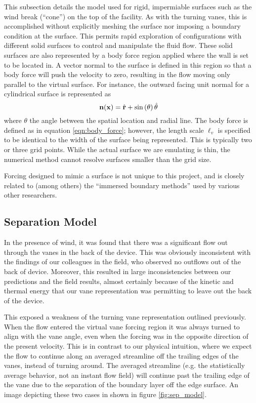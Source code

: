 This subsection details the model used for rigid, impermiable surfaces such as the 
wind break (``cone'') on the top of the facility. As with the turning vanes, 
this is accomplished without explicitly meshing the surface nor imposing 
a boundary condition at the surface. This permits rapid exploration of configurations 
with different solid surfaces to control and manipulate the fluid flow. These solid surfaces
are also represented by a body force region applied where the wall is set to be located in. 
A vector normal to the surface is defined in this region so that a body force will push 
the velocity to zero, resulting in the flow moving only parallel to the virtual surface. 
For instance, the outward facing unit normal for a cylindrical surface is represented as
\begin{equation}
 {\bf n}({\bf x}) = \hat{{\bf r}}+ \sin \left(\theta\right) \hat{{\bf \theta}}
\end{equation}
where $\theta$ the angle between the spatial location and radial line. 
The body force is defined as in equation \ref{eqn:body_force}; however, 
the length scale $\ell_v$ is specified to be identical to the width 
of the surface being represented. This is typically two or three grid points. 
While the actual surface we are emulating is thin, the numerical method cannot resolve
surfaces smaller than the grid size. 

Forcing designed to mimic a surface
is not unique to this project, and is closely related to (among others)
the ``immersed boundary methods'' used by various other
researchers\cite{doi:10.1146/annurev.fluid.37.061903.175743}. 


\subsection{Separation Model}

In the presence of wind, it was found that there was a significant flow
out through the vanes in the back of the device. This was obviously
inconsistent with the findings of our colleagues in the field, who
observed no outflows out of the back of device. Moreover, this resulted
in large inconsistencies between our predictions and the field results,
almost certainly because of the kinetic and thermal energy that our vane
representation was permitting to leave out the back of the device.  

This exposed a weakness of the turning vane representation outlined
previously. When the flow entered the virtual vane forcing region it was
always turned to align with the vane angle, even when the forcing was in
the opposite direction of the present velocity.
This is in contrast to our physical intuition, where we
expect the flow to continue along an averaged streamline
off the trailing edges of the vanes, instead of turning around. 
The averaged streamline (e.g. the statistically average behavior, not
an instant flow field) will continue past the trailing edge of the vane
due to the separation of the boundary layer off the edge surface. An
image depicting these two cases in shown in figure \ref{fig:sep_model}.  

